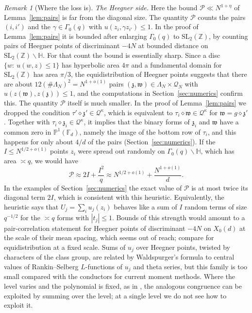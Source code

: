 \documentclass[11pt]{amsart}
\theoremstyle{remark}
\newtheorem{remark}[theorem]{Remark}
\theoremstyle{definition}
\numberwithin{equation}{section}
\newcommand{\Qc}{\mathcal{Q}}
\newcommand{\Pc}{\mathcal{P}}
\newcommand{\Z}{\mathbb{Z}}
\newcommand{\Hb}{\mathbb{H}}
\newcommand{\gz}{\mathfrak{z}}
\newcommand{\gw}{\mathfrak{w}}
\newcommand{\SL}{\mathrm{SL}}
\begin{document}
\begin{remark}[Where the loss is]
\emph{The Heegner side.} Here the bound $\Pc\ll N^{1+\eta}$ of Lemma~\ref{lem:pairs} is far from the diagonal size. The quantity $\Pc$ counts the pairs $(i,i')$ and the $\gamma\in\Gamma_0(q)$ with $u(z_i,\gamma z_{i'})\le1$. In the proof of Lemma~\ref{lem:pairs} it is bounded after enlarging $\Gamma_0(q)$ to $\SL_2(\Z)$, by counting pairs of Heegner points of discriminant $-4N$ at bounded distance on $\SL_2(\Z)\backslash\Hb$. For that count the bound is essentially sharp. Since a disc $\{w:\ u(w,z)\le1\}$ has hyperbolic area $4\pi$ and a fundamental domain for $\SL_2(\Z)$ has area $\pi/3$, the equidistribution of Heegner points \cite{Du88} suggests that there are about $12(\#\Lambda_N)^2=N^{1+o(1)}$ pairs $(\gz,\gw)\in\Lambda_N\times\Qc_N$ with $u(z(\gw),z(\gz))\le1$, and the computations in Section~\ref{sec:numerics} confirm this. The quantity $\Pc$ itself is much smaller. In the proof of Lemma~\ref{lem:pairs} we dropped the condition $\tau'\diamond\gz'\in\Qc^\kappa$, which is equivalent to $\tau_i\diamond\gw\in\Qc^\kappa$ for $\gw=g\diamond\gz'$. Together with $\tau_i\diamond\gz_i\in\Qc^\kappa$, it implies that the binary forms of $\gz_i$ and $\gw$ have a common zero in $\mathbb P^1(\mathbb F_d)$, namely the image of the bottom row of $\tau_i$, and this happens for only about $4/d$ of the pairs (Section~\ref{sec:numerics}). If the $I\le N^{1/2+o(1)}$ points $z_i$ were spread out randomly on $\Gamma_0(q)\backslash\Hb$, which has area $\asymp q$, we would have
\[
\Pc\approx 2I+\frac{I^2}{q}\approx N^{1/2+o(1)}+\frac{N^{1+o(1)}}{d}.
\]
In the examples of Section~\ref{sec:numerics} the exact value of $\Pc$ is at most twice its diagonal term $2I$, which is consistent with this heuristic. Equivalently, the heuristic says that $U_j=\sum_iu_j(z_i)$ behaves like a sum of $I$ random terms of size $q^{-1/2}$ for the $\asymp q$ forms with $|t_j|\le1$. Bounds of this strength would amount to a pair-correlation statement for Heegner points of discriminant $-4N$ on $X_0(d)$ at the scale of their mean spacing, which seems out of reach; compare \cite{Du88} for equidistribution at a fixed scale. Sums of $u_j$ over Heegner points, twisted by characters of the class group, are related by Waldspurger's formula \cite{Wal} to central values of Rankin--Selberg $L$-functions of $u_j$ and theta series, but this family is too small compared with the conductors for current moment methods. Where the level varies and the polynomial is fixed, as in \cite{GM2}, the analogous congruence can be exploited by summing over the level; at a single level we do not see how to exploit it.


\end{remark}
\end{document}
